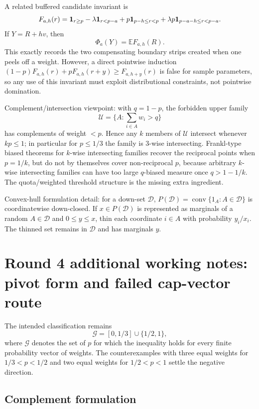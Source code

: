 \documentclass[12pt]{article}
\newcommand{\conv}{\operatorname{conv}}
\begin{document}
A related buffered candidate invariant is
\[
F_{a,h}(r)=
{\bf1}_{r\ge p}
-\lambda{\bf1}_{r<p-a}
+p{\bf1}_{p-h\le r<p}
+\lambda p{\bf1}_{p-a-h\le r<p-a}.
\]
If \(Y=R+h v\), then
\[
\Phi_a(Y)=\mathbb E F_{a,h}(R).
\]
This exactly records the two compensating boundary strips created when one
peels off a weight.  However, a direct pointwise induction
\((1-p)F_{a,h}(r)+pF_{a,h}(r+y)\ge F_{a,h+y}(r)\) is false for sample
parameters, so any use of this invariant must exploit distributional
constraints, not pointwise domination.

Complement/intersection viewpoint: with \(q=1-p\), the forbidden upper family
\[
  \mathcal U=\{A:\sum_{i\in A}w_i>q\}
\]
has complements of weight \(<p\).  Hence any \(k\) members of \(\mathcal U\)
intersect whenever \(kp\le1\); in particular for \(p\le1/3\) the family is
3-wise intersecting.  Frankl-type biased theorems for \(k\)-wise intersecting
families recover the reciprocal points when \(p=1/k\), but do not by themselves
cover non-reciprocal \(p\), because arbitrary \(k\)-wise intersecting families
can have too large \(q\)-biased measure once \(q>1-1/k\).  The quota/weighted
threshold structure is the missing extra ingredient.

Convex-hull formulation detail: for a down-set \(\mathcal D\),
\(P(\mathcal D)=\conv\{1_A:A\in\mathcal D\}\) is coordinatewise down-closed.
If \(x\in P(\mathcal D)\) is represented as marginals of a random
\(A\in\mathcal D\) and \(0\le y\le x\), thin each coordinate \(i\in A\) with
probability \(y_i/x_i\).  The thinned set remains in \(\mathcal D\) and has
marginals \(y\).









\section*{Round 4 additional working notes: pivot form and failed cap-vector route}

The intended classification remains
\[
        \mathcal G=[0,1/3]\cup\{1/2,1\},
\]
where \(\mathcal G\) denotes the set of \(p\) for which the inequality holds
for every finite probability vector of weights.  The counterexamples with
three equal weights for \(1/3<p<1/2\) and two equal weights for \(1/2<p<1\)
settle the negative direction.

\subsection*{Complement formulation}
\end{document}
